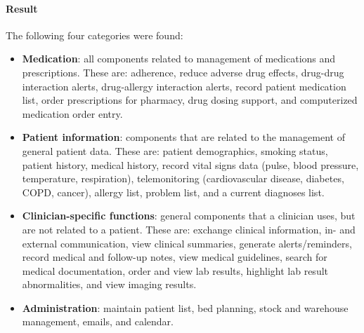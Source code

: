         \paragraph{Result} The following four categories were found:
        \begin{itemize}
            \item \textbf{Medication}: all components related to management of medications and prescriptions. These are: adherence, reduce adverse drug effects, drug-drug interaction alerts, drug-allergy interaction alerts, record patient medication list, order prescriptions for pharmacy, drug dosing support, and computerized medication order entry.
            \item \textbf{Patient information}: components that are related to the management of general patient data. These are: patient demographics, smoking status, patient history, medical history, record vital signs data (pulse, blood pressure, temperature, respiration), telemonitoring (cardiovascular disease, diabetes, COPD, cancer), allergy list, problem list, and a current diagnoses list.
            \item \textbf{Clinician-specific functions}: general components that a clinician uses, but are not related to a patient. These are: exchange clinical information, in- and external communication, view clinical summaries, generate alerts/reminders, record medical and follow-up notes, view medical guidelines, search for medical documentation, order and view lab results, highlight lab result abnormalities, and view imaging results.
            \item \textbf{Administration}: maintain patient list, bed planning, stock and warehouse management, emails, and calendar.
        \end{itemize}

